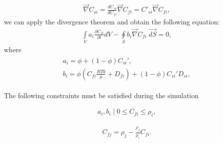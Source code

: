 \documentclass[a4paper,14pt,english]{extreport}
\begin{document}
\begin{eqnarray}
\label{eq:langm_fick_chain_rule_spaceder}
\vec\nabla C_{si} =  \frac{dC_{si}}{dC_{fi}}\vec\nabla C_{fi} = C'_{si}\vec\nabla C_{fi},
\end{eqnarray}
we can apply the divergence theorem and obtain the following equation:
\begin{eqnarray}
\label{eq:langm_fick_diffusivity_simplified_integral}
\int \limits_{V} a_{i} \frac{\partial C_{fi}}{\partial t} d V - \oint \limits_{S} b_{i} \vec{\nabla}C_{fi} \; \vec{dS} =  \mathit{0},
\end{eqnarray}
where  
\begin{eqnarray}
\begin{gathered}
\label{eq:langm_fick_diffusivity_a_b_coeffs}
a_{i}  =  \phi + \left(\mathit{1}-\phi \right)C_{si}', \\ 
b_{i}  = \phi \left(C_{fi} \frac{RTk}{\mu} + D_{fi}\right) + \left(\mathit{1}-\phi \right) C_{si}'D_{si},
\end{gathered}
\end{eqnarray}

The following constraints must be satisfied during the simulation

\begin{eqnarray}
\label{eq:angm_fick_concentration_constaints}
a_{i}, b_{i} \mid  \mathit{0} \leq C_{fi} \leq \rho_i,
\end{eqnarray}

\begin{eqnarray}
\label{eq:langm_fick_diffusivity_densities}
C_{fj} =\rho_j -  \frac{\rho_j}{\rho_i}C_{fi}.
\end{eqnarray} 
 
\end{document}
